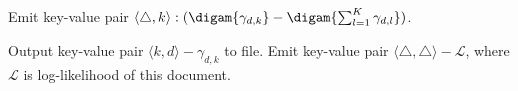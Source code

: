 \begin{frame}[fragile]
\begin{algorithm}[H]
\begin{scriptsize}
\begin{algorithmic}[1]
			\STATE \alert<3>{Emit} key-value pair $\langle \triangle, k \rangle : 
                        (\digam{\gamma_{d, k}} - \digam{\sum_{l=1}^K \gamma_{d,
                          l}})$.


			\STATE \alert<3>{Output} key-value pair $\langle k, d \rangle - \gamma_{d, k}$ to file.
		\ENDFOR
		\STATE \alert<3>{Emit} key-value pair $\langle \triangle, \triangle \rangle - \mathcal{L}$, where $\mathcal{L}$ is log-likelihood of this document.

	\end{algorithmic}
	
	\end{scriptsize}

	
\end{algorithm}


\end{frame}




